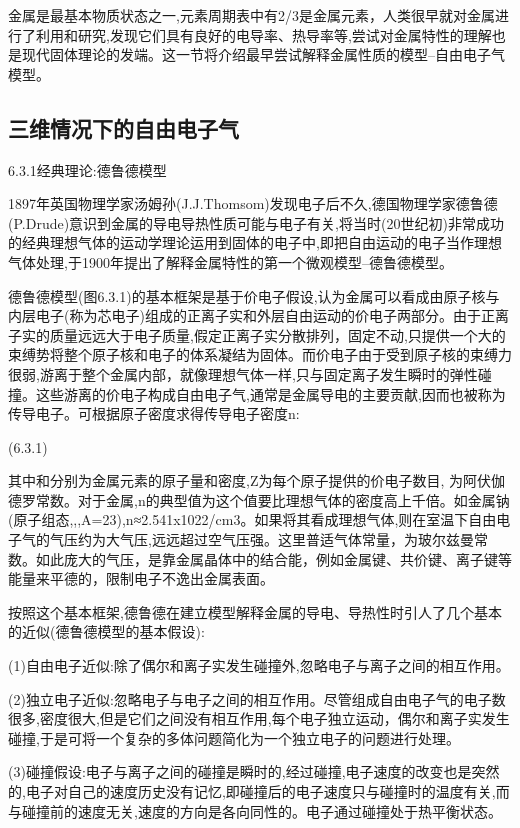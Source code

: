 金属是最基本物质状态之一,元素周期表中有2/3是金属元素，人类很早就对金属进行了利用和研究,发现它们具有良好的电导率、热导率等,尝试对金属特性的理解也是现代固体理论的发端。这一节将介绍最早尝试解释金属性质的模型--自由电子气模型。

\subsection{三维情况下的自由电子气}
6.3.1经典理论:德鲁德模型

1897年英国物理学家汤姆孙(J.J.Thomsom)发现电子后不久,德国物理学家德鲁德(P.Drude)意识到金属的导电导热性质可能与电子有关,将当时(20世纪初)非常成功的经典理想气体的运动学理论运用到固体的电子中,即把自由运动的电子当作理想气体处理,于1900年提出了解释金属特性的第一个微观模型--德鲁德模型。



德鲁德模型(图6.3.1)的基本框架是基于价电子假设,认为金属可以看成由原子核与内层电子(称为芯电子)组成的正离子实和外层自由运动的价电子两部分。由于正离子实的质量远远大于电子质量,假定正离子实分散排列，固定不动,只提供一个大的束缚势将整个原子核和电子的体系凝结为固体。而价电子由于受到原子核的束缚力很弱,游离于整个金属内部，就像理想气体一样,只与固定离子发生瞬时的弹性碰撞。这些游离的价电子构成自由电子气,通常是金属导电的主要贡献,因而也被称为传导电子。可根据原子密度求得传导电子密度n:

 	(6.3.1)

其中和分别为金属元素的原子量和密度,Z为每个原子提供的价电子数目, 为阿伏伽德罗常数。对于金属,n的典型值为这个值要比理想气体的密度高上千倍。如金属钠(原子组态,,,A=23),n≈2.541x1022/cm3。如果将其看成理想气体,则在室温下自由电子气的气压约为大气压,远远超过空气压强。这里普适气体常量，为玻尔兹曼常数。如此庞大的气压，是靠金属晶体中的结合能，例如金属键、共价键、离子键等能量来平德的，限制电子不逸出金属表面。

按照这个基本框架,德鲁德在建立模型解释金属的导电、导热性时引人了几个基本的近似(德鲁德模型的基本假设):

(1)自由电子近似:除了偶尔和离子实发生碰撞外,忽略电子与离子之间的相互作用。

(2)独立电子近似:忽略电子与电子之间的相互作用。尽管组成自由电子气的电子数很多,密度很大,但是它们之间没有相互作用,每个电子独立运动，偶尔和离子实发生碰撞,于是可将一个复杂的多体问题简化为一个独立电子的问题进行处理。

(3)碰撞假设:电子与离子之间的碰撞是瞬时的,经过碰撞,电子速度的改变也是突然的,电子对自己的速度历史没有记忆,即碰撞后的电子速度只与碰撞时的温度有关,而与碰撞前的速度无关,速度的方向是各向同性的。电子通过碰撞处于热平衡状态。

